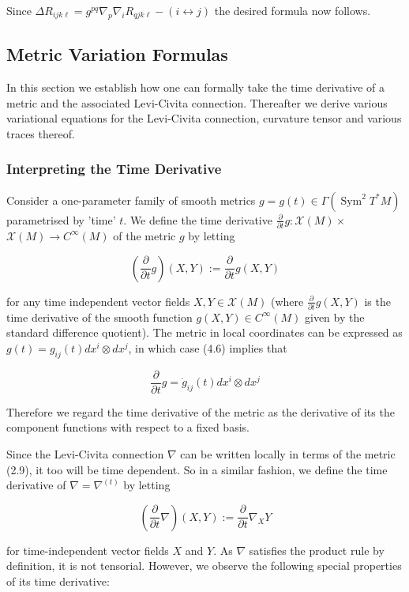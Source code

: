 \documentclass[10pt, letterpaper]{article}
\begin{document}
Since $\Delta R_{i j k \ell}=g^{p q} \nabla_{p} \nabla_{i} R_{q j k \ell}-(i \leftrightarrow j)$ the desired formula now follows.

\subsection*{Metric Variation Formulas}
In this section we establish how one can formally take the time derivative of a metric and the associated Levi-Civita connection. Thereafter we derive various variational equations for the Levi-Civita connection, curvature tensor and various traces thereof.

\subsubsection*{Interpreting the Time Derivative}
Consider a one-parameter family of smooth metrics $g=g(t) \in \Gamma\left(\operatorname{Sym}^{2} T^{*} M\right)$ parametrised by 'time' $t$. We define the time derivative $\frac{\partial}{\partial t} g: \mathscr{X}(M) \times$ $\mathscr{X}(M) \rightarrow C^{\infty}(M)$ of the metric $g$ by letting

$$
\left(\frac{\partial}{\partial t} g\right)(X, Y):=\frac{\partial}{\partial t} g(X, Y)
$$

for any time independent vector fields $X, Y \in \mathscr{X}(M)$ (where $\frac{\partial}{\partial t} g(X, Y)$ is the time derivative of the smooth function $g(X, Y) \in C^{\infty}(M)$ given by the standard difference quotient). The metric in local coordinates can be expressed as $g(t)=g_{i j}(t) d x^{i} \otimes d x^{j}$, in which case (4.6) implies that

$$
\frac{\partial}{\partial t} g=\dot{g}_{i j}(t) d x^{i} \otimes d x^{j}
$$

Therefore we regard the time derivative of the metric as the derivative of its the component functions with respect to a fixed basis.

Since the Levi-Civita connection $\nabla$ can be written locally in terms of the metric (2.9), it too will be time dependent. So in a similar fashion, we define the time derivative of $\nabla=\nabla^{(t)}$ by letting

$$
\left(\frac{\partial}{\partial t} \nabla\right)(X, Y):=\frac{\partial}{\partial t} \nabla_{X} Y
$$

for time-independent vector fields $X$ and $Y$. As $\nabla$ satisfies the product rule by definition, it is not tensorial. However, we observe the following special properties of its time derivative:
\end{document}
